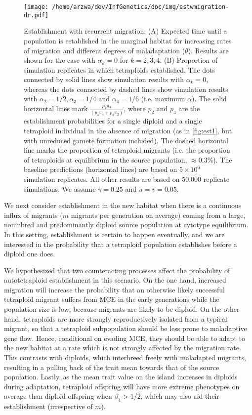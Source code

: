 \documentclass[12pt,a4paper]{article}
\begin{document}
\begin{figure}[t]
\centering
\texttt{[image: /home/arzwa/dev/InfGenetics/doc/img/estwmigration-dr.pdf]}
\caption{
    Establishment with recurrent migration.
    (A) Expected time until a population is established in the marginal habitat
    for increasing rates of migration and different degrees of maladaptation
    ($\theta$). Results are shown for the case with $\alpha_k = 0$ for
    $k=2,3,4$. 
    (B) Proportion of simulation replicates in which tetraploids established.
    The dots connected by solid lines show simulation results with
    $\alpha_k=0$, whereas the dots connected by dashed lines
    show simulation results with $\alpha_2=1/2, \alpha_3=1/4$ and
    $\alpha_4=1/6$ (i.e. maximum $\alpha$).
    The solid horizontal lines mark $\frac{p_4\pi_4}{(p_4\pi_4 + p_2\pi_2)}$,
    where $p_2$ and $p_4$ are the establishment probabilities for a single
    diploid and a single tetraploid individual in the absence of migration (as
    in \cref{fig:est1}, but with unreduced gamete formation included). 
    The dashed horizontal line marks the proportion of tetraploid migrants
    (i.e. the proportion of tetraploids at equilibrium in the source
    population, $\approx 0.3$\%).
    The baseline predictions (horizontal lines) are based on $5\times 10^6$
    simulation replicates.
    All other results are based on 50.000 replicate simulations.
    We assume $\gamma=0.25$ and $u=v=0.05$.
    \label{fig:estwmig}}
\end{figure}

We next consider establishment in the new habitat when there is a continuous
influx of migrants ($m$ migrants per generation on average) coming from a large,
noninbred and predominantly diploid source population at cytotype equilibrium.
In this setting, establishment is certain to happen eventually, and we are
interested in the probability that a tetraploid population establishes before a
diploid one does.

We hypothesized that two counteracting processes affect the probability of
autotetraploid establishment in this scenario.
On the one hand, increased migration will increase the probability that an
otherwise likely successful tetraploid migrant suffers from MCE in the early
generations while the population size is low, because migrants are likely to be
diploid.
On the other hand, tetraploids are more strongly reproductively isolated from
a typical migrant, so that a tetraploid subpopulation should be less prone to
maladaptive gene flow.
Hence, conditional on evading MCE, they should be able to adapt to the new
habitat at a rate which is not strongly affected by the migration rate.
This contrasts with diploids, which interbreed freely with maladapted
migrants, resulting in a pulling back of the trait mean towards that of the
source population.
Lastly, as the mean trait value on the island increases in diploids
during adaptation, tetraploid offspring will have more extreme phenotypes on
average than diploid offspring when $\beta_4 > 1/2$, which may also aid their
establishment (irrespective of $m$).
\end{document}
